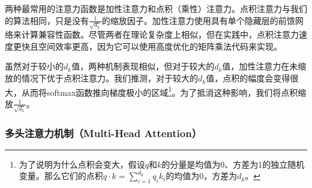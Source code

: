 \documentclass[lang=cn,a4paper,newtx]{elegantpaper}
\begin{document}
两种最常用的注意力函数是加性注意力和点积（乘性）注意力。点积注意力与我们的算法相同，只是没有$\frac{1}{\sqrt{d_k}}$的缩放因子。加性注意力使用具有单个隐藏层的前馈网络来计算兼容性函数。尽管两者在理论复杂度上相似，但在实践中，点积注意力速度更快且空间效率更高，因为它可以使用高度优化的矩阵乘法代码来实现。

虽然对于较小的$d_k$值，两种机制表现相似，但对于较大的$d_k$值，加性注意力在未缩放的情况下优于点积注意力。我们推测，对于较大的$d_k$值，点积的幅度会变得很大，从而将softmax函数推向梯度极小的区域\footnote{为了说明为什么点积会变大，假设$q$和$k$的分量是均值为$0$、方差为$1$的独立随机变量。那么它们的点积$q \cdot k = \sum_{i=1}^{d_k} q_ik_i$的均值为$0$，方差为$d_k$。}。为了抵消这种影响，我们将点积缩放$\frac{1}{\sqrt{d_k}}$。

\subsubsection{多头注意力机制（Multi-Head Attention）} \label{sec:multihead}
\end{document}
